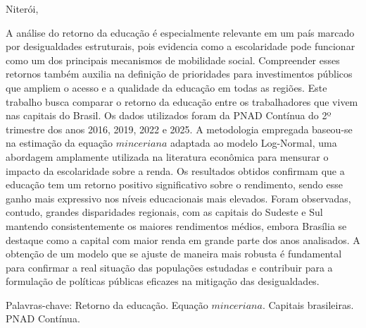 \documentclass[12pt,a4paper,header]{abnt}
\begin{document}
\begin{folhadeaprovacao}
\begin{minipage}{.7\textwidth}
\begin{flushright}
\begin{espacosimples}
\end{espacosimples}

\end{flushright}

\vspace{1.5cm}
\hfill Niterói, \ABNTdatadata

\end{minipage}

\end{folhadeaprovacao}





\begin{resumo}
A análise do retorno da educação é especialmente relevante em um país marcado por desigualdades estruturais, pois evidencia como a escolaridade pode funcionar como um dos principais mecanismos de mobilidade social. Compreender esses retornos também auxilia na definição de prioridades para investimentos públicos que ampliem o acesso e a qualidade da educação em todas as regiões. Este trabalho busca comparar o retorno da educação entre os trabalhadores que vivem nas capitais do Brasil. Os dados utilizados foram da PNAD Contínua do 2º trimestre dos anos 2016, 2019, 2022 e 2025. A metodologia empregada baseou-se na estimação da equação $minceriana$ adaptada ao modelo Log-Normal, uma abordagem amplamente utilizada na literatura econômica para mensurar o impacto da escolaridade sobre a renda. Os resultados obtidos confirmam que a educação tem um retorno positivo significativo sobre o rendimento, sendo esse ganho mais expressivo nos níveis educacionais mais elevados. Foram observadas, contudo, grandes disparidades regionais, com as capitais do Sudeste e Sul mantendo consistentemente os maiores rendimentos médios, embora Brasília se destaque como a capital com maior renda em grande parte dos anos analisados. A obtenção de um modelo que se ajuste de maneira mais robusta é fundamental para confirmar a real situação das populações estudadas e contribuir para a formulação de políticas públicas eficazes na mitigação das desigualdades.

\vspace{1cm}
\noindent Palavras-chave: Retorno da educação. Equação $minceriana$. Capitais brasileiras. PNAD Contínua.
\end{resumo}
\end{document}
